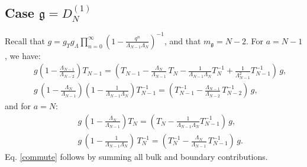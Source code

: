 \documentclass[12pt]{amsart}
\newcommand{\g}{{\mathfrak{g}}}
\newcommand{\lL}{{\Lambda}}
\numberwithin{equation}{section}
\begin{document}
\subsection{Case $\g=D_{N}^{(1)}$}\label{D1sec} Recall that $g=g_Tg_\lL\prod_{n=0}^\infty \left(1-\frac{q^n}{\lL_{N-1}\lL_N}\right)^{-1}$, and that $m_\g=N-2$.
For $a=N-1$, we have:
\begin{eqnarray*}
&&g\left(1-\frac{\lL_{N-1}}{\lL_{N-2}}\right) T_{N-1}= \left( T_{N-1} -\frac{\Lambda_{N}}{\Lambda_{N-1}}\, T_{N}-\frac{1}{\Lambda_{N-1}\Lambda_{N}} T_{N}^{-1}+\frac{1}{\Lambda_{N-1}^2} T_{N-1}^{-1}\right)\, g, \\
&&g\, \left(1-\frac{\Lambda_{N}}{\Lambda_{N-1}}\right)\left(1-\frac{1}{\Lambda_{N-1}\Lambda_{N}}\right) T_{N-1}^{-1}=
\left(T_{N-1}^{-1}-\frac{\Lambda_{N-1}}{\Lambda_{N-2}} \,T_{N-2}^{-1}\right)\, g,
\end{eqnarray*}
and for $a=N$:
\begin{eqnarray*}
%
%
&&g\, \left(1-\frac{\Lambda_{N}}{\Lambda_{N-1}}\right) T_{N}=\left( T_{N} -\frac{1}{\Lambda_{N-1}\Lambda_{N}} T_{N-1}^{-1}\right)\, g,\\
&&g\,\left(1-\frac{1}{\Lambda_{N-1}\Lambda_{N}}\right)\, T_N^{-1}=\left(T_{N}^{-1}-\frac{\Lambda_{N}}{\Lambda_{N-1}}\, T_{N-1}^{-1}\right)\, g.
\end{eqnarray*}
Eq. \eqref{commute} follows by summing all bulk and boundary contributions.
\end{document}
